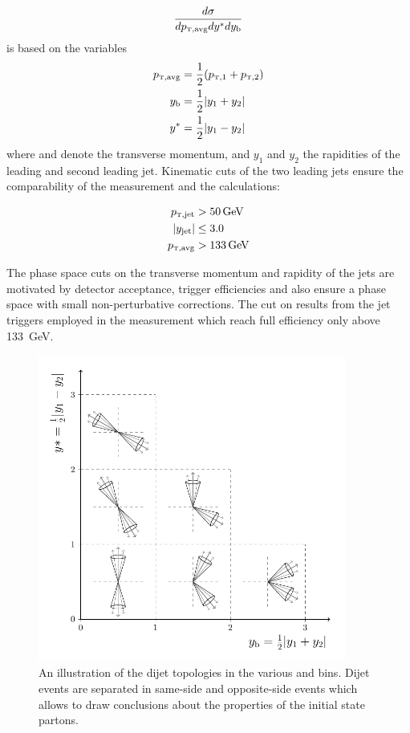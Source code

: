 \begin{equation*}
    \frac{d \sigma}{d \ptavg d\ystar d \yboost}
\end{equation*}
%
is based on the variables
%
\begin{align*}
\ptavg &=\frac{1}{2}(\ptone + \pttwo)\\
\yboost& =\frac{1}{2}|y_1 + y_2|\\
\ystar &=\frac{1}{2}|y_1 - y_2|
\end{align*}
%
where \ptone and \pttwo denote the transverse momentum, and $y_1$ and $y_2$ the
rapidities of the leading and second leading jet. Kinematic cuts of the two
leading jets ensure the comparability of the measurement and the calculations:

\begin{align*}
    \ptjet &> \SI{50}{\GeV}\\
    |y_\mathrm{jet}| &\leq 3.0\\
    \ptavg &> \SI{133}{\GeV}
\end{align*}

The phase space cuts on the transverse momentum and rapidity of the jets are
motivated by detector acceptance, trigger efficiencies and also ensure a phase
space with small non-perturbative corrections. The cut on \ptavg results from
the jet triggers employed in the measurement which reach full efficiency only
above \SI{133}{\GeV}.

\begin{figure}[h!tbp]
    \centering
    \includegraphics[width=0.9\textwidth]{figures/drawings/ybys.pdf}
    \caption[Dijet topologies in \ystar and \yboost phase space]
        {An illustration of the dijet topologies in the various \ystar and
        \yboost bins. Dijet events are separated in same-side and opposite-side
        events which allows to draw conclusions about the properties of the
    initial state partons.}
    \label{fig:ysyb_schema}
\end{figure}

